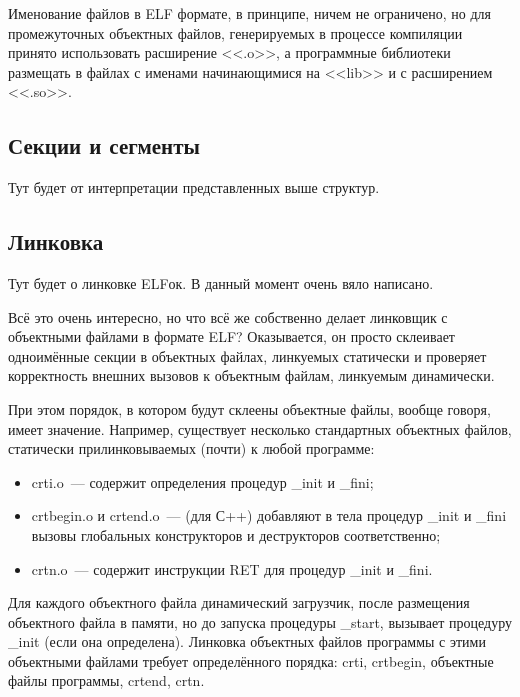 Именование файлов в ELF формате, в принципе, ничем не ограничено, но для промежуточных объектных файлов, генерируемых в процессе компиляции принято использовать расширение <<.o>>, а программные библиотеки размещать в файлах с именами начинающимися на <<lib>> и с расширением <<.so>>.

\subsection{Секции и сегменты}
Тут будет от интерпретации представленных выше структур.

\subsection{Линковка}
Тут будет о линковке ELFок. В данный момент очень вяло написано.

Всё это очень интересно, но что всё же собственно делает линковщик с объектными файлами в формате ELF?
Оказывается, он просто склеивает одноимённые секции в объектных файлах, линкуемых статически и проверяет корректность внешних вызовов к объектным файлам, линкуемым динамически.

При этом порядок, в котором будут склеены объектные файлы, вообще говоря, имеет значение.
Например, существует несколько стандартных объектных файлов, статически прилинковываемых (почти) к любой программе:
\begin{itemize}
    \item crti.o~--- содержит определения процедур \_init и \_fini;
    \item crtbegin.o и crtend.o~--- (для С++) добавляют в тела процедур \_init и \_fini вызовы глобальных конструкторов и деструкторов соответственно;
    \item crtn.o~--- содержит инструкции RET для процедур \_init и \_fini.
\end{itemize}
Для каждого объектного файла динамический загрузчик, после размещения объектного файла в памяти, но до запуска процедуры \_start, вызывает процедуру \_init (если она определена).
Линковка объектных файлов программы с этими объектными файлами требует определённого порядка: crti, crtbegin, объектные файлы программы, crtend, crtn.

